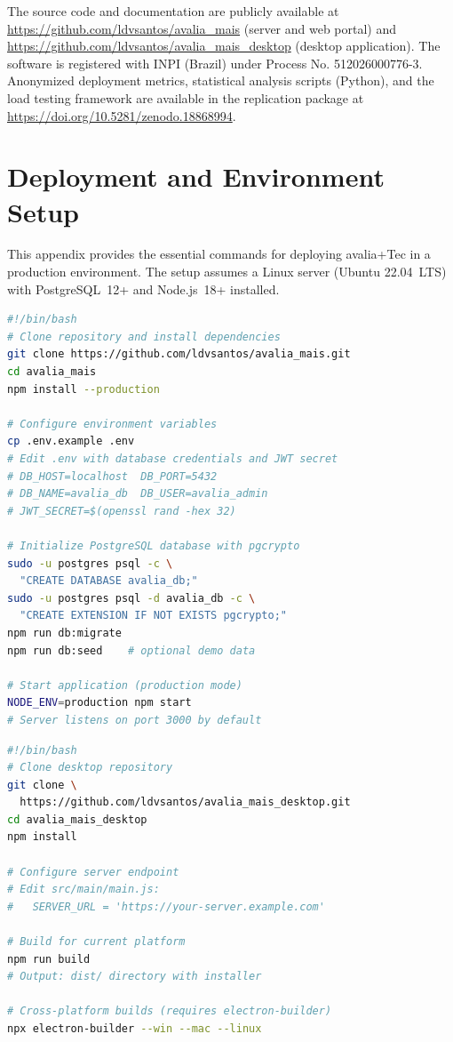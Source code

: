\documentclass[preprint,12pt,a4paper]{elsarticle}
\begin{document}
The source code and documentation are publicly available at \url{https://github.com/ldvsantos/avalia_mais} (server and web portal) and \url{https://github.com/ldvsantos/avalia_mais_desktop} (desktop application). The software is registered with INPI (Brazil) under Process No. 512026000776-3. Anonymized deployment metrics, statistical analysis scripts (Python), and the load testing framework are available in the replication package at \url{https://doi.org/10.5281/zenodo.18868994}.

\appendix

\section{Deployment and Environment Setup}
\label{app:deployment}

This appendix provides the essential commands for deploying avalia+Tec in a production environment. The setup assumes a Linux server (Ubuntu 22.04~LTS) with PostgreSQL~12+ and Node.js~18+ installed.

\begin{lstlisting}[language=sh, caption={Server-side deployment of the avalia+Tec backend and web portal. The script clones the repository, installs dependencies, configures the database, and starts the application.}, label=lst:deploy]
#!/bin/bash
# Clone repository and install dependencies
git clone https://github.com/ldvsantos/avalia_mais.git
cd avalia_mais
npm install --production

# Configure environment variables
cp .env.example .env
# Edit .env with database credentials and JWT secret
# DB_HOST=localhost  DB_PORT=5432
# DB_NAME=avalia_db  DB_USER=avalia_admin
# JWT_SECRET=$(openssl rand -hex 32)

# Initialize PostgreSQL database with pgcrypto
sudo -u postgres psql -c \
  "CREATE DATABASE avalia_db;"
sudo -u postgres psql -d avalia_db -c \
  "CREATE EXTENSION IF NOT EXISTS pgcrypto;"
npm run db:migrate
npm run db:seed    # optional demo data

# Start application (production mode)
NODE_ENV=production npm start
# Server listens on port 3000 by default
\end{lstlisting}

\begin{lstlisting}[language=sh, caption={Building the Electron desktop application for evaluators. Produces platform-specific installers for Windows, macOS, and Linux.}, label=lst:desktopbuild]
#!/bin/bash
# Clone desktop repository
git clone \
  https://github.com/ldvsantos/avalia_mais_desktop.git
cd avalia_mais_desktop
npm install

# Configure server endpoint
# Edit src/main/main.js:
#   SERVER_URL = 'https://your-server.example.com'

# Build for current platform
npm run build
# Output: dist/ directory with installer

# Cross-platform builds (requires electron-builder)
npx electron-builder --win --mac --linux
\end{lstlisting}



\end{document}
